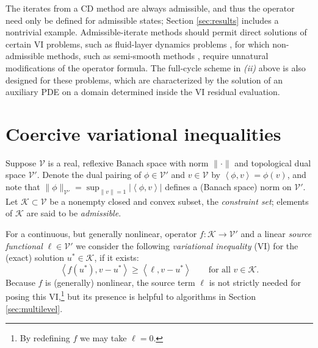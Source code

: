 \documentclass[letterpaper,final,12pt,reqno]{amsart}
\theoremstyle{cstyle}
\theoremstyle{cstyle*}
\theoremstyle{dstyle}
\numberwithin{equation}{section}
\numberwithin{figure}{section}
\numberwithin{table}{section}
\numberwithin{theorem}{section}
\newcommand{\cK}{\mathcal{K}}
\newcommand{\cV}{\mathcal{V}}
\newcommand{\ip}[2]{\left<#1,#2\right>}
\begin{document}
The iterates from a CD method are always admissible, and thus the operator need only be defined for admissible states; Section \ref{sec:results} includes a nontrivial example.  Admissible-iterate methods should permit direct solutions of certain VI problems, such as fluid-layer dynamics problems \cite{Bueler2021conservation,JouvetBueler2012}, for which non-admissible methods, such as semi-smooth methods \cite{BensonMunson2006}, require unnatural modifications of the operator formula.  The full-cycle scheme in \emph{(ii)} above is also designed for these problems, which are characterized by the solution of an auxiliary PDE on a domain determined inside the VI residual evaluation.



\section{Coercive variational inequalities} \label{sec:vi}

Suppose $\cV$ is a real, reflexive Banach space with norm $\|\cdot\|$ and topological dual space $\cV'$.  Denote the dual pairing of $\phi \in \cV'$ and $v\in\cV$ by $\ip{\phi}{v} = \phi(v)$, and note that $\|\phi\|_{\cV'} = \sup_{\|v\|=1} |\ip{\phi}{v}|$ defines a (Banach space) norm on $\cV'$.  Let $\cK \subset \cV$ be a nonempty closed and convex subset, the \emph{constraint set}; elements of $\cK$ are said to be \emph{admissible}.

For a continuous, but generally nonlinear, operator $f:\cK \to \cV'$ and a linear \emph{source functional} $\ell\in \cV'$ we consider the following \emph{variational inequality} (VI) for the (exact) solution $u^*\in \cK$, if it exists:
\begin{equation}
\ip{f(u^*)}{v-u^*} \ge \ip{\ell}{v-u^*} \qquad \text{for all } v\in \cK. \label{eq:vi}
\end{equation}
Because $f$ is (generally) nonlinear, the source term $\ell$ is not strictly needed for posing this VI,\footnote{By redefining $f$ we may take $\ell=0$.} but its presence is helpful to algorithms in Section \ref{sec:multilevel}.
\end{document}

